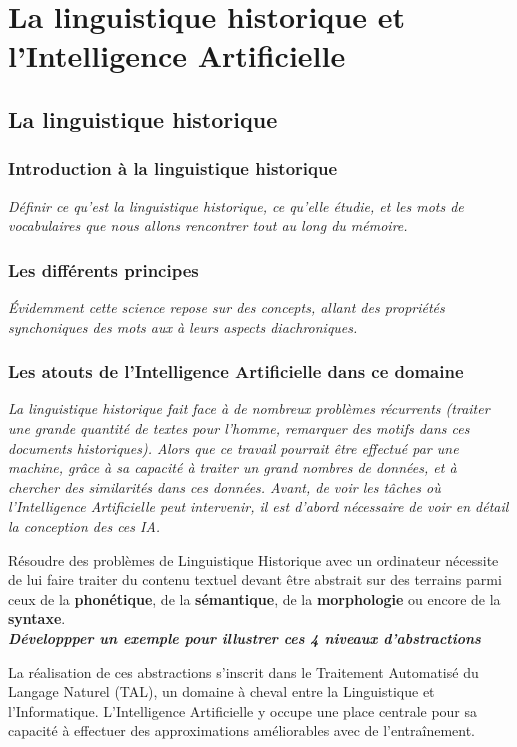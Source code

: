 \documentclass[12pt, french]{report}
\begin{document}
\chapter{La linguistique historique et l'Intelligence Artificielle}
\section{La linguistique historique}
\subsection{Introduction à la linguistique historique}
\textit{Définir ce qu'est la linguistique historique, ce qu'elle étudie, et les mots de vocabulaires que nous allons rencontrer tout au long du mémoire.}
\subsection{Les différents principes}
\textit{Évidemment cette science repose sur des concepts, allant des propriétés synchoniques des mots aux à leurs aspects diachroniques.}
\subsection{Les atouts de l'Intelligence Artificielle dans ce domaine}
\textit{La linguistique historique fait face à de nombreux problèmes récurrents (traiter une grande quantité de textes pour l'homme, remarquer des motifs dans ces documents historiques). Alors que ce travail pourrait être effectué par une machine, grâce à sa capacité à traiter un grand nombres de données, et à chercher des similarités dans ces données. Avant, de voir les tâches où l'Intelligence Artificielle peut intervenir, il est d'abord nécessaire de voir en détail la conception des ces IA.}

Résoudre des problèmes de Linguistique Historique avec un ordinateur nécessite de lui faire traiter
du contenu textuel devant être abstrait sur des terrains parmi ceux de la \textbf{phonétique}, de la
\textbf{sémantique}, de la \textbf{morphologie} ou encore de la \textbf{syntaxe}.\\
\textbf{\textit{Développper un exemple pour illustrer ces 4 niveaux d'abstractions}}

La réalisation de ces abstractions s'inscrit dans le Traitement Automatisé du Langage Naturel (TAL),
un domaine à cheval entre la Linguistique et l'Informatique. L'Intelligence Artificielle y occupe
une place centrale pour sa capacité à effectuer des approximations améliorables avec de l'entraînement.
\end{document}
